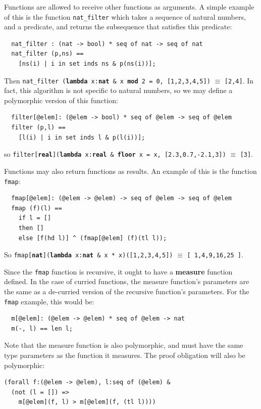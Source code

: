 \documentclass{overturerepchap}
\newcommand{\keyw}[1]{{\bf\ttfamily #1}}
\begin{document}
Functions are allowed to receive other functions as arguments. A
simple example of this is the function \texttt{nat\_filter} which
takes a sequence of natural numbers, and a predicate, and returns the
subsequence that satisfies this predicate:
\begin{lstlisting}
  nat_filter : (nat -> bool) * seq of nat -> seq of nat
  nat_filter (p,ns) ==
    [ns(i) | i in set inds ns & p(ns(i))];
\end{lstlisting}
Then 
  \texttt{nat\_filter (\keyw{lambda} x:\keyw{nat} \& x \keyw{mod} 2 = 0, [1,2,3,4,5])} $\equiv$ \texttt{[2,4]}.
In fact, this algorithm is not specific to natural numbers, so we may
define a polymorphic version of this function:
\begin{lstlisting}
  filter[@elem]: (@elem -> bool) * seq of @elem -> seq of @elem
  filter (p,l) ==
    [l(i) | i in set inds l & p(l(i))];
\end{lstlisting}
\label{filterdef}
so \texttt{filter[\keyw{real}](\keyw{lambda} x:\keyw{real} \&
  \keyw{floor} x = x, [2.3,0.7,-2.1,3])} $\equiv$  \texttt{[3]}.

\vspace{1ex}
Functions may also return functions as results. An example of this is
the function \texttt{fmap}:
\begin{lstlisting}
  fmap[@elem]: (@elem -> @elem) -> seq of @elem -> seq of @elem
  fmap (f)(l) ==
    if l = []
    then []
    else [f(hd l)] ^ (fmap[@elem] (f)(tl l));
\end{lstlisting}
So \texttt{fmap[\keyw{nat}](\keyw{lambda} x:\keyw{nat} \& x * x)([1,2,3,4,5])} $\equiv$ 
\texttt{[ 1,4,9,16,25 ]}.

\vspace{1ex}
\noindent Since the \texttt{fmap} function is recursive, it ought to have a \keyw{measure}
function defined. In the case of curried functions, the measure function's parameters
are the same as a de-curried version of the recursive function's parameters. For
the \texttt{fmap} example, this would be:
\begin{lstlisting}
  m[@elem]: (@elem -> @elem) * seq of @elem -> nat
  m(-, l) == len l;
\end{lstlisting}
Note that the measure function is also polymorphic, and must have the same type
parameters as the function it measures. The proof obligation will also be polymorphic:
\begin{lstlisting}
(forall f:(@elem -> @elem), l:seq of (@elem) &
  (not (l = []) =>
    m[@elem](f, l) > m[@elem](f, (tl l))))
\end{lstlisting}
\end{document}
